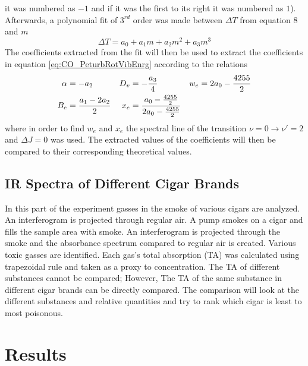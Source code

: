 \documentclass[reprint,amsmath,amssymb,aps, prl]{revtex4-2}
\begin{document}
it was numbered as $-1$ and if it was the first to its right
it was numbered as $1$). Afterwards, a polynomial fit of $3^{rd}$ order was made between $\Delta T$ from equation 8 
and $m$
\begin{equation} \label{eq:CO_EnrgStatesFit}
    \Delta T = a_{0}+a_{1}m+a_{2}m^2+a_{3}m^3
\end{equation}
The coefficients extracted from the fit will then be used to extract the coefficients in equation \ref{eq:CO_PeturbRotVibEnrg}
according to the relations 
\begin{equation}
\begin{aligned}
\alpha &=-a_{2} & D_{v}&=-\frac{a_{3}}{4} & w_{e}&=2a_{0}-\frac{4255}{2} \\
B_{e}&=\frac{a_{1}-2a_{2}}{2} &  x_{e}&=\frac{a_{0}-\frac{4255}{2}}{2a_{0}-\frac{4255}{2}}
\end{aligned}
\label{eq:COFITcoefficients}
\centering
\end{equation}
where in order to find $w_{e}$ and $x_{e}$ the spectral line of the transition $\nu =0 \rightarrow \nu'=2$ and $\Delta J =0$ was used. The extracted values of the coefficients will then be compared to their corresponding theoretical values.

\subsection{IR Spectra of Different Cigar Brands}
In this part of the experiment gasses in the smoke of various cigars are analyzed. An interferogram is projected through regular air. A pump smokes on a cigar and fills the sample area with smoke. An interferogram is projected through the smoke and the absorbance spectrum compared to regular air is created. Various toxic gasses are identified. Each gas's total absorption (TA) was calculated using trapezoidal rule \cite{numerical} and taken as a proxy to concentration. The TA of different substances cannot be compared; However, The TA of the same substance in different cigar brands can be directly compared. The comparison will look at the different substances and relative quantities and try to rank which cigar is least to most poisonous.

\section{Results}
\end{document}
